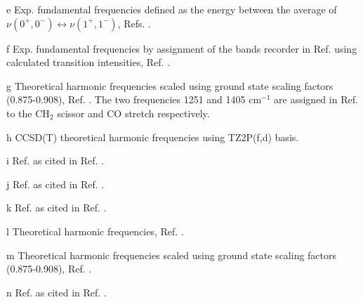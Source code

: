 \begin{center}
\begin{table}[ht!]
\begin{threeparttable}
\begin{tablenotes}
\item[e] Exp. fundamental frequencies defined as the energy between the average of $\nu(0^+,0^-)\leftrightarrow\nu(1^+,1^-)$, Refs. .
\item[f] Exp. fundamental frequencies by assignment of the bands recorder in Ref.  using calculated transition intensities, Ref. .
\item[g] Theoretical harmonic frequencies scaled using ground state scaling factors (0.875-0.908), Ref. .
The two frequencies 1251 and 1405 cm$^{-1}$ are assigned in Ref.
 to the CH$_2$ scissor and CO stretch respectively.
\item[h] CCSD(T) theoretical harmonic frequencies using TZ2P(f,d) basis.
\item[i] Ref.  as cited in Ref. .
\item[j] Ref.  as cited in Ref. .
\item[k] Ref.  as cited in Ref. .
\item[l] Theoretical harmonic frequencies, Ref. .
\item[m] Theoretical harmonic frequencies scaled using ground state scaling factors (0.875-0.908), Ref. .
\item[n] Ref.  as cited in Ref. .
\end{tablenotes}
\end{threeparttable}
\end{table}
\end{center}
